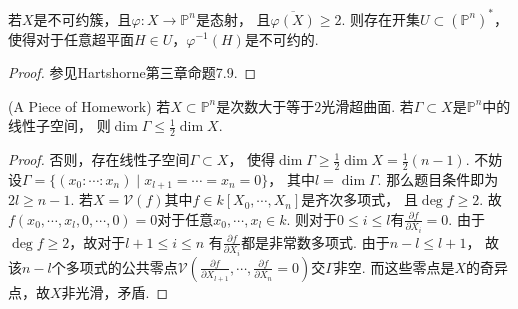    \begin{theorem}[Bertini-3]
        若$X$是不可约簇，且$\varphi\colon X \rightarrow \mathbb{P}^{n}$是态射，
        且$\overline{\varphi(X)} \geq 2$. 
        则存在开集$U \subset (\mathbb{P}^{n})^{*}$，
        使得对于任意超平面$H \in U$，$\varphi^{-1}(H)$是不可约的.
    \end{theorem}
    \begin{proof}
        参见Hartshorne第三章命题7.9.
    \end{proof}

    \begin{remark}(A Piece of Homework)
        若$X \subset \mathbb{P}^{n}$是次数大于等于$2$光滑超曲面. 
        若$\Gamma \subset X$是$\mathbb{P}^{n}$中的线性子空间，
        则$\dim \Gamma \leq \frac{1}{2}\dim X$.
    \end{remark}
    \begin{proof}
        否则，存在线性子空间$\Gamma \subset X$，
        使得$\dim \Gamma \geq \frac{1}{2}\dim X = \frac{1}{2}(n-1)$. 
        不妨设$\Gamma = \{(x_{0}:\cdots:x_{n})\mid x_{l+1}=\cdots=x_{n}=0\}$，
        其中$l = \dim \Gamma$. 那么题目条件即为$2l \geq n-1$.
        若$X = \mathcal{V}(f)$其中$f \in k[X_{0},\cdots,X_{n}]$是齐次多项式，
        且$\deg f \geq 2$. 
        故$f(x_{0},\cdots,x_{l},0,\cdots,0)=0$对于任意$x_{0},\cdots,x_{l} \in k$.
        则对于$0 \leq i \leq l$有$\frac{\partial f}{\partial X_{i}}=0$.
        由于$\deg f \geq 2$，故对于$l+1 \leq i \leq n$
        有$\frac{\partial f}{\partial X_{i}}$都是非常数多项式. 由于$n-l \leq l+1 $，
        故该$n-l$个多项式的公共零点$\mathcal{V}(\frac{\partial f}{\partial X_{l+1}},\cdots,\frac{\partial f}{\partial X_{n}}=0)$交$\Gamma$非空.
        而这些零点是$X$的奇异点，故$X$非光滑，矛盾.
    \end{proof}